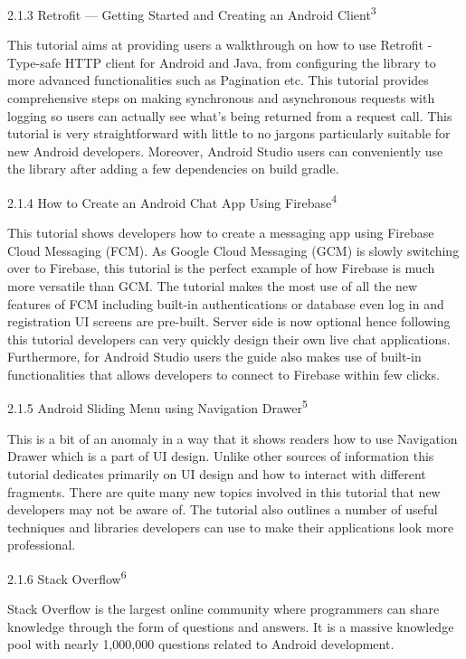 \documentclass{article}
\begin{document}
\begin{flushleft}
{\large 2.1.3 Retrofit — Getting Started and Creating an Android Client\textsuperscript{3}}\par
This tutorial aims at providing users a walkthrough on how to use Retrofit - Type-safe HTTP client for Android and Java, from configuring the library to more advanced functionalities such as Pagination etc. This tutorial provides comprehensive steps on making synchronous and asynchronous requests with logging so users can actually see what's being returned from a request call. This tutorial is very straightforward with little to no jargons particularly suitable for new Android developers. Moreover, Android Studio users can conveniently use the library after adding a few dependencies on build gradle. \par
{\large 2.1.4 How to Create an Android Chat App Using Firebase\textsuperscript{4}}\par
This tutorial shows developers how to create a messaging app using Firebase Cloud Messaging (FCM). As Google Cloud Messaging (GCM) is slowly switching over to Firebase, this tutorial is the perfect example of how Firebase is much more versatile than GCM. The tutorial makes the most use of all the new features of FCM including built-in authentications or database even log in and registration UI screens are pre-built. Server side is now optional hence following this tutorial developers can very quickly design their own live chat applications. Furthermore, for Android Studio users the guide also makes use of built-in functionalities that allows developers to connect to Firebase within few clicks.\par
{\large 2.1.5 Android Sliding Menu using Navigation Drawer\textsuperscript{5}}\par
This is a bit of an anomaly in a way that it shows readers how to use Navigation Drawer which is a part of UI design. Unlike other sources of information this tutorial dedicates primarily on UI design and how to interact with different fragments. There are quite many new topics involved in this tutorial that new developers may not be aware of. The tutorial also outlines a number of useful techniques and libraries developers can use to make their applications look more professional.\par
{\large 2.1.6 Stack Overflow\textsuperscript{6}}\par
Stack Overflow is the largest online community where programmers can share knowledge through the form of questions and answers. It is a massive knowledge pool with nearly 1,000,000 questions related to Android development.\par

\end{flushleft}
\end{document}
